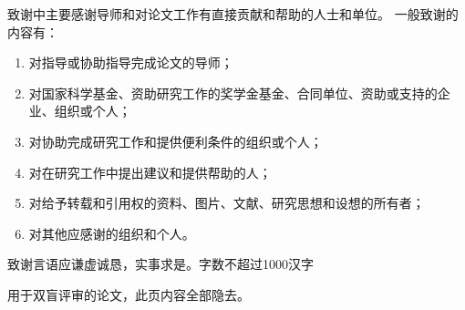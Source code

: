 致谢中主要感谢导师和对论文工作有直接贡献和帮助的人士和单位。
一般致谢的内容有：
\begin{enumerate}[label=(\chinese*),itemindent=2em]

    \item 对指导或协助指导完成论文的导师；
    \item 对国家科学基金、资助研究工作的奖学金基金、合同单位、资助或支持的企业、组织或个人；
    \item 对协助完成研究工作和提供便利条件的组织或个人；
    \item 对在研究工作中提出建议和提供帮助的人；
    \item 对给予转载和引用权的资料、图片、文献、研究思想和设想的所有者；
    \item 对其他应感谢的组织和个人。

\end{enumerate}

致谢言语应谦虚诚恳，实事求是。字数不超过1000汉字

\vspace{\baselineskip}
{\color{red} 用于双盲评审的论文，此页内容全部隐去。}

\newpage
\indent
\newpage
